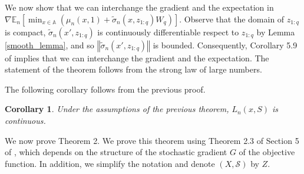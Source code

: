 \documentclass[letterpaper]{article}
\newcommand{\bmu}[1]{\bm{\mu}^{(#1)}}
\newtheorem{corollary}{Corollary}
\numberwithin{equation}{section}
\renewcommand{\S}{\mathcal{S}}
\begin{document}
We now show that we can interchange the gradient and the expectation in $\nabla \mathbb{E}_n\left[\min_{x \in \mathbb{A}} \left(\mu_{n} \left(x, 1\right)+\tilde{\sigma}_n\left(x, z_{1:q}\right)W_q\right)\right]$. Observe that the domain of $z_{1:q}$ is compact,  $\tilde{\sigma}_{n}\left(x',z_{1:q}\right)$ is continuously  differentiable respect to $z_{1:q}$ by Lemma \ref{smooth_lemma}, and so $\left\Vert\tilde{\sigma}_{n}\left(x',z_{1:q}\right)\right\Vert$ is bounded. Consequently, Corollary 5.9 of \citet{bartle} implies that we can interchange the gradient and the expectation. The statement of the theorem follows from the strong law of large numbers.
\endproof

The following corollary follows from the previous proof.

\begin{corollary}
Under the assumptions of the previous theorem, $L_{n}(x,S)$ is continuous.
\end{corollary}

We now prove Theorem 2.
\proof{}
We prove this theorem using Theorem 2.3 of Section 5 of \citet{kushner2003stochastic}, which depends on the structure of the stochastic gradient  $G$ of the objective function. In addition, we simplify the notation and denote $(X,\S)$  by $Z$.


\end{document}
